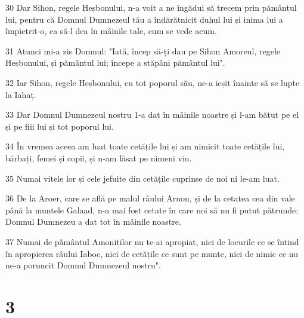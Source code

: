 \par 30 Dar Sihon, regele Heșbonului, n-a voit a ne îngădui să trecem prin pământul lui, pentru că Domnul Dumnezeul tău a îndărătnicit duhul lui și inima lui a împietrit-o, ca să-l dea în mâinile tale, cum se vede acum.
\par 31 Atunci mi-a zis Domnul: "Iată, încep să-ți dau pe Sihon Amoreul, regele Heșbonului, și pământul lui; începe a stăpâni pământul lui".
\par 32 Iar Sihon, regele Heșbonului, cu tot poporul său, ne-a ieșit înainte să se lupte la Iahaț.
\par 33 Dar Domnul Dumnezeul nostru 1-a dat în mâinile noastre și l-am bătut pe el și pe fiii lui și tot poporul lui.
\par 34 În vremea aceea am luat toate cetățile lui și am nimicit toate cetățile lui, bărbați, femei și copii, și n-am lăsat pe nimeni viu.
\par 35 Numai vitele lor și cele jefuite din cetățile cuprinse de noi ni le-am luat.
\par 36 De la Aroer, care se află pe malul râului Arnon, și de la cetatea cea din vale până la muntele Galaad, n-a mai fost cetate în care noi să nu fi putut pătrunde: Domnul Dumnezeu a dat tot în mâinile noastre.
\par 37 Numai de pământul Amoniților nu te-ai apropiat, nici de locurile ce se întind în apropierea râului Iaboc, nici de cetățile ce sunt pe munte, nici de nimic ce nu ne-a poruncit Domnul Dumnezeul nostru".

\chapter{3}

